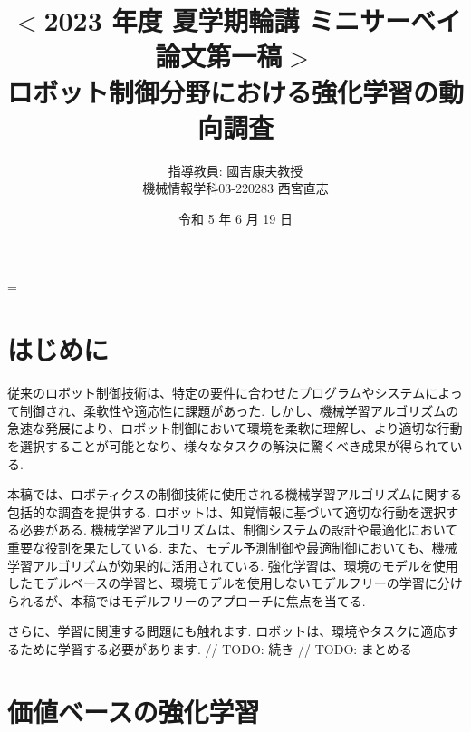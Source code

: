 \documentclass[a4j, twocolumn, 10pt,pdflatex,ja=standard]{bxjsarticle}
\title{{\small $<$2023 年度 夏学期輪講 ミニサーベイ論文第一稿$>$}\\
       {\Large ロボット制御分野における強化学習の動向調査}\vspace{-4mm}}
\author{{\normalsize 指導教員: 國吉康夫教授\\機械情報学科03-220283 西宮直志}\vspace{-4mm}}
\date{\small 令和 5 年 6 月 19 日}
\makeatletter
\renewcommand\maketitle{
  \ifnum \col@number=\@ne \@maketitle
  \else \twocolumn[
    \vspace{-16mm}
    \@maketitle
  ]
  \fi
 }
\makeatother
\begin{document}
\maketitle \thispagestyle{empty}
\normalsize
\vspace{-8mm}

\section{はじめに}

従来のロボット制御技術は、特定の要件に合わせたプログラムやシステムによって制御され、柔軟性や適応性に課題があった. しかし、機械学習アルゴリズムの急速な発展により、ロボット制御において環境を柔軟に理解し、より適切な行動を選択することが可能となり、様々なタスクの解決に驚くべき成果が得られている. 

本稿では、ロボティクスの制御技術に使用される機械学習アルゴリズムに関する包括的な調査を提供する. ロボットは、知覚情報に基づいて適切な行動を選択する必要がある. 機械学習アルゴリズムは、制御システムの設計や最適化において重要な役割を果たしている. また、モデル予測制御や最適制御においても、機械学習アルゴリズムが効果的に活用されている. 強化学習は、環境のモデルを使用したモデルベースの学習と、環境モデルを使用しないモデルフリーの学習に分けられるが、本稿ではモデルフリーのアプローチに焦点を当てる. 

さらに、学習に関連する問題にも触れます. ロボットは、環境やタスクに適応するために学習する必要があります.  
// TODO: 続き
// TODO: まとめる






\section{価値ベースの強化学習}
\end{document}
